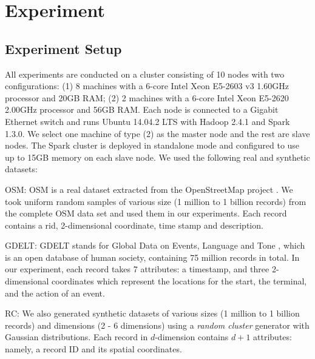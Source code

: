\section{Experiment}
\label{sec:exp}

\subsection{Experiment Setup}
\label{sec:setupexp}
All experiments are conducted on a cluster consisting of 10 nodes with
two configurations: (1) 8 machines with a 6-core Intel Xeon E5-2603 v3
1.60GHz processor and 20GB RAM; (2) 2 machines with a 6-core Intel
Xeon E5-2620 2.00GHz processor and 56GB RAM. Each node is connected to
a Gigabit Ethernet switch and runs Ubuntu 14.04.2 LTS with Hadoop
2.4.1 and Spark 1.3.0. We select one machine of type (2) as the master
node and the rest are slave nodes. The Spark cluster is deployed in
standalone mode and configured to use up to 15GB memory on each slave
node. We used the following real and synthetic datasets: \vspace{-1mm}
\begin{pkl}
\item OSM: OSM is a real dataset extracted from the OpenStreetMap
  project \cite{osm}.  We took uniform random samples of various size
  (1 million to 1 billion records) from the complete OSM data set and
  used them in our experiments. Each record contains a rid,
  2-dimensional coordinate, time stamp and description.
\item GDELT: GDELT stands for Global Data on Events, Language and Tone
  \cite{gdelt}, which is an open database of human society, containing
  75 million records in total. In our experiment, each record takes 7
  attributes: a timestamp, and three 2-dimensional coordinates which
  represent the locations for the start, the terminal, and the action
  of an event.
\item RC: We also generated synthetic datasets of various sizes (1
  million to 1 billion records) and dimensions (2 - 6 dimensions)
  using a {\em random cluster} generator with Gaussian
  distributions. Each record in $d$-dimension contains $d+1$
  attributes: namely, a record ID and its spatial coordinates.
\end{pkl}\vspace{-2mm}

